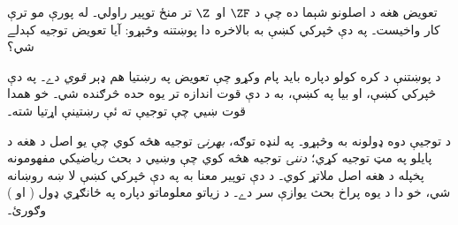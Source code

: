 \documentclass[../../../include/open-logic-section]{subfiles}
\begin{document}

تعويض هغه د اصلونو شېما ده چې د $\ZF$ او~$\Z$ تر منځ توپير
راولي۔ له  پورې مو ترې
کار واخيست۔ په دې څپرکي کښې به بالاخره دا پوښتنه وڅېړو: آيا تعويض
توجيه کېدلے شي؟

د پوښتنې د کره کولو دپاره بايد پام وکړو چې تعويض په رښتيا هم ډېر
\emph{قوي} دے۔ په دې څپرکي کښې، او بيا په
 کښې، به د دې قوت اندازه
تر يوه حده څرګنده شي۔ خو همدا قوت ښيي چې توجيې ته ئې رښتينې اړتيا شته۔

د توجيې دوه ډولونه به وڅېړو۔ په لنډه توګه، \emph{بهرنۍ} توجيه
هڅه کوي چې يو اصل د هغه د پايلو په مټ توجيه کړي؛ \emph{دننۍ} توجيه
هڅه کوي چې وښيي د بحث رياضيکي مفهومونه پخپله د هغه اصل ملاتړ کوي۔ د
دې توپير معنا به په دې څپرکي کښې لا ښه روښانه شي، خو دا د يوه پراخ
بحث يوازې سر دے۔ د زياتو معلوماتو دپاره په ځانګړي ډول
\citeauthor{Maddy1988a} (\citeyear{Maddy1988a} او
\citeyear{Maddy1988b}) وګورئ۔
\end{document}
